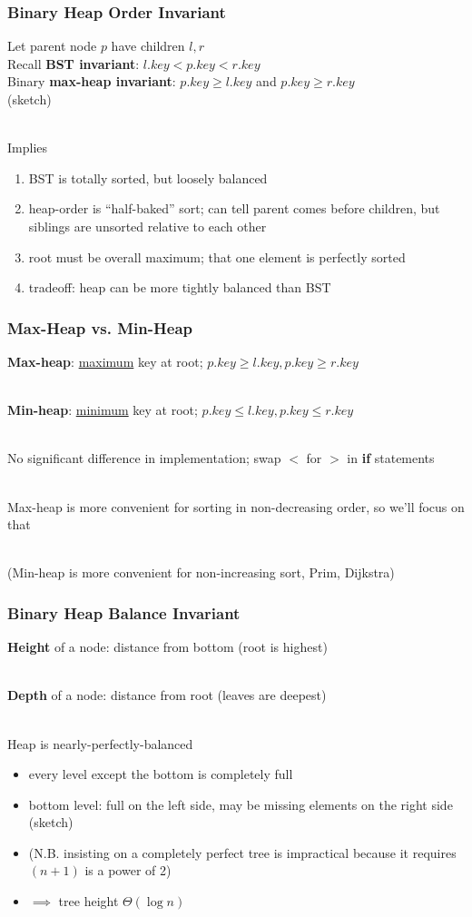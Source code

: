 \documentclass{beamer}
\newcommand{\stanza}{ \\~\ }
\begin{document}
\begin{frame} \frametitle{Binary Heap Order Invariant}

Let parent node $p$ have children $l, r$ \\
Recall \textbf{BST invariant}: $l.key < p.key < r.key$ \\
Binary \textbf{max-heap invariant}: $p.key \geq l.key$ and $p.key \geq r.key$ \\
(sketch) \stanza

Implies
\begin{enumerate}
  \item BST is totally sorted, but loosely balanced
  \item heap-order is ``half-baked'' sort; can tell parent comes before children,
    but siblings are unsorted relative to each other
  \item root must be overall maximum; that one element is perfectly sorted
  \item tradeoff: heap can be more tightly balanced than BST
\end{enumerate}

\end{frame}

\begin{frame} \frametitle{Max-Heap vs. Min-Heap}

\textbf{Max-heap}: \underline{maximum} key at root; $p.key \geq l.key, p.key \geq r.key$ \stanza

\textbf{Min-heap}: \underline{minimum} key at root; $p.key \leq l.key, p.key \leq r.key$ \stanza

No significant difference in implementation; swap $<$ for $>$ in \textbf{if} statements \stanza

Max-heap is more convenient for sorting in non-decreasing order, so we'll focus on that \stanza

(Min-heap is more convenient for non-increasing sort, Prim, Dijkstra)

\end{frame}

\begin{frame} \frametitle{Binary Heap Balance Invariant}

\textbf{Height} of a node: distance from bottom (root is highest) \stanza

\textbf{Depth} of a node: distance from root (leaves are deepest) \stanza

Heap is nearly-perfectly-balanced
\begin{itemize}
  \item every level except the bottom is completely full
  \item bottom level: full on the left side, may be missing elements on the
    right side (sketch)
  \item (N.B. insisting on a completely perfect tree is impractical because it requires $(n+1)$ is a power of 2)
  \item $\implies$ tree height $\Theta(\log n)$
\end{itemize}

\end{frame}
\end{document}
